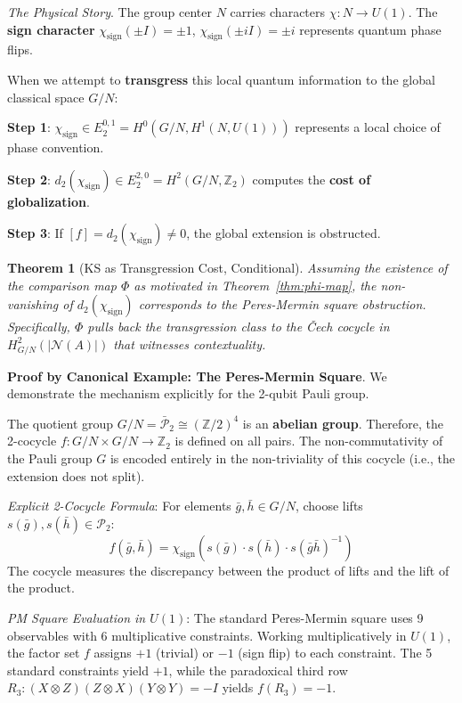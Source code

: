 \documentclass[11pt]{article}
\newtheorem{theorem}{Theorem}[section]
\begin{document}
\textit{The Physical Story}.
The group center $N$ carries characters $\chi: N \to U(1)$. The \textbf{sign character} $\chi_{\text{sign}}(\pm I) = \pm 1$, $\chi_{\text{sign}}(\pm iI) = \pm i$ represents quantum phase flips.

When we attempt to \textbf{transgress} this local quantum information to the global classical space $G/N$:

\textbf{Step 1}: $\chi_{\text{sign}} \in E_2^{0,1} = H^0(G/N, H^1(N, U(1)))$ represents a local choice of phase convention.

\textbf{Step 2}: $d_2(\chi_{\text{sign}}) \in E_2^{2,0} = H^2(G/N, \mathbb{Z}_2)$ computes the \textbf{cost of globalization}.

\textbf{Step 3}: If $[f] = d_2(\chi_{\text{sign}}) \neq 0$, the global extension is obstructed.

\begin{theorem}[KS as Transgression Cost, Conditional]\label{thm:ks-transgression}
Assuming the existence of the comparison map $\Phi$ as motivated in Theorem~\ref{thm:phi-map}, the non-vanishing of $d_2(\chi_{\text{sign}})$ corresponds to the Peres-Mermin square obstruction. Specifically, $\Phi$ pulls back the transgression class to the \v{C}ech cocycle in $H^2_{G/N}(|\mathcal{N}(A)|)$ that witnesses contextuality.
\end{theorem}

\textbf{Proof by Canonical Example: The Peres-Mermin Square}.
We demonstrate the mechanism explicitly for the 2-qubit Pauli group.

The quotient group $G/N = \bar{\mathcal{P}}_2 \cong (\mathbb{Z}/2)^4$ is an \textbf{abelian group}. Therefore, the 2-cocycle $f: G/N \times G/N \to \mathbb{Z}_2$ is defined on all pairs. The non-commutativity of the Pauli group $G$ is encoded entirely in the non-triviality of this cocycle (i.e., the extension does not split).

\emph{Explicit 2-Cocycle Formula}:
For elements $\bar{g}, \bar{h} \in G/N$, choose lifts $s(\bar{g}), s(\bar{h}) \in \mathcal{P}_2$:
\[
f(\bar{g}, \bar{h}) = \chi_{\text{sign}}(s(\bar{g}) \cdot s(\bar{h}) \cdot s(\bar{g}\bar{h})^{-1})
\]
The cocycle measures the discrepancy between the product of lifts and the lift of the product.

\emph{PM Square Evaluation in $U(1)$}:
The standard Peres-Mermin square uses 9 observables with 6 multiplicative constraints. Working multiplicatively in $U(1)$, the factor set $f$ assigns $+1$ (trivial) or $-1$ (sign flip) to each constraint. The 5 standard constraints yield $+1$, while the paradoxical third row $R_3: (X \otimes Z)(Z \otimes X)(Y \otimes Y) = -I$ yields $f(R_3) = -1$.
\end{document}
